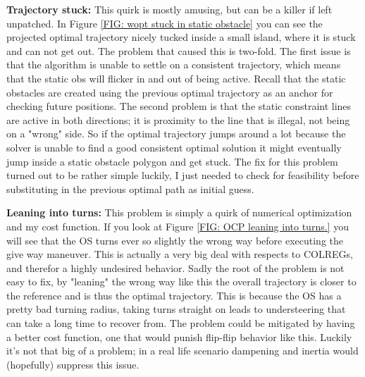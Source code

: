 \textbf{Trajectory stuck:}\newline
This quirk is mostly amusing, but can be a killer if left unpatched. In Figure \ref{FIG: wopt stuck in static obstacle} you can
see the projected optimal trajectory nicely tucked inside a small island, where it is stuck and can not get out. The problem that caused
this is two-fold. The first issue is that the algorithm is unable to settle on a consistent trajectory, which means that the static obs
will flicker in and out of being active. Recall that the static obstacles are created using the previous optimal trajectory as an
anchor for checking future positions. The second problem is that the static constraint lines are active in both directions; it is proximity
to the line that is illegal, not being on a "wrong" side. So if the optimal trajectory jumps around a lot because the solver is unable
to find a good consistent optimal solution it might eventually jump inside a static obstacle polygon and get stuck. The fix for this
problem turned out to be rather simple luckily, I just needed to check for feasibility before substituting in the previous
optimal path as initial guess.

\textbf{Leaning into turns:}\newline
This problem is simply a quirk of numerical optimization and my cost function. If you look at Figure \ref{FIG: OCP leaning into turns.}
you will see that the OS turns ever so slightly the wrong way before executing the give way maneuver. This is actually a very big deal with
respects to COLREGs, and therefor a highly undesired behavior. Sadly the root of the problem is not easy to fix, by "leaning" the wrong way
like this the overall trajectory is closer to the reference and is thus the optimal trajectory. This is because the OS has a pretty
bad turning radius, taking turns straight on leads to understeering that can take a long time to recover from. The problem could
be mitigated by having a better cost function, one that would punish flip-flip behavior like this. Luckily it's not that big of a problem; 
in a real life scenario dampening and inertia would (hopefully) suppress this issue.


